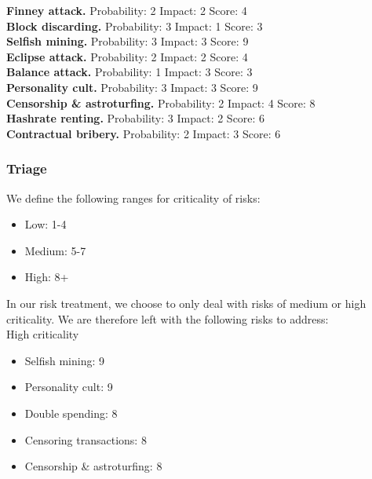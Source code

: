 \documentclass[12pt,a4paper]{article}
\begin{document}
\textbf{Finney attack.}
Probability: 2
Impact: 2
Score: 4\\

\textbf{Block discarding.}
Probability: 3
Impact: 1
Score: 3\\

\textbf{Selfish mining.}
Probability: 3
Impact: 3
Score: 9\\

\textbf{Eclipse attack.}
Probability: 2
Impact: 2
Score: 4\\

\textbf{Balance attack.}
Probability: 1
Impact: 3
Score: 3\\

\textbf{Personality cult.}
Probability: 3
Impact: 3
Score: 9\\

\textbf{Censorship \& astroturfing.}
Probability: 2
Impact: 4
Score: 8\\

\textbf{Hashrate renting.}
Probability: 3
Impact: 2
Score: 6\\

\textbf{Contractual bribery.}
Probability: 2
Impact: 3
Score: 6\\

\subsubsection{Triage}

We define the following ranges for criticality of risks:
\begin{itemize}
  \item Low: 1-4
  \item Medium: 5-7
  \item High: 8+
\end{itemize}

In our risk treatment, we choose to only deal with risks of medium or high criticality. We are therefore left with the following risks to address:\\

High criticality
\begin{itemize}
  \item Selfish mining: 9
  \item Personality cult: 9
  \item Double spending: 8
  \item Censoring transactions: 8
  \item Censorship \& astroturfing: 8
\end{itemize}
\end{document}
